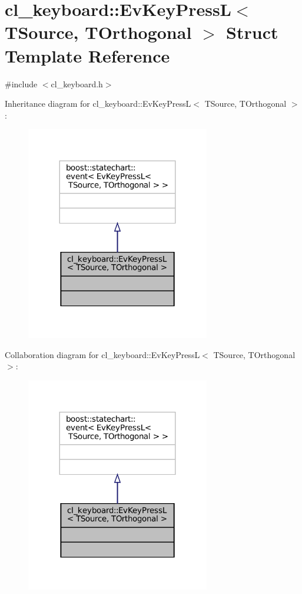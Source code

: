 \hypertarget{structcl__keyboard_1_1EvKeyPressL}{}\section{cl\+\_\+keyboard\+:\+:Ev\+Key\+PressL$<$ T\+Source, T\+Orthogonal $>$ Struct Template Reference}
\label{structcl__keyboard_1_1EvKeyPressL}


{\ttfamily \#include $<$cl\+\_\+keyboard.\+h$>$}



Inheritance diagram for cl\+\_\+keyboard\+:\+:Ev\+Key\+PressL$<$ T\+Source, T\+Orthogonal $>$\+:
\nopagebreak
\begin{figure}[H]
\begin{center}
\leavevmode
\includegraphics[width=227pt]{structcl__keyboard_1_1EvKeyPressL__inherit__graph}
\end{center}
\end{figure}


Collaboration diagram for cl\+\_\+keyboard\+:\+:Ev\+Key\+PressL$<$ T\+Source, T\+Orthogonal $>$\+:
\nopagebreak
\begin{figure}[H]
\begin{center}
\leavevmode
\includegraphics[width=227pt]{structcl__keyboard_1_1EvKeyPressL__coll__graph}
\end{center}
\end{figure}


